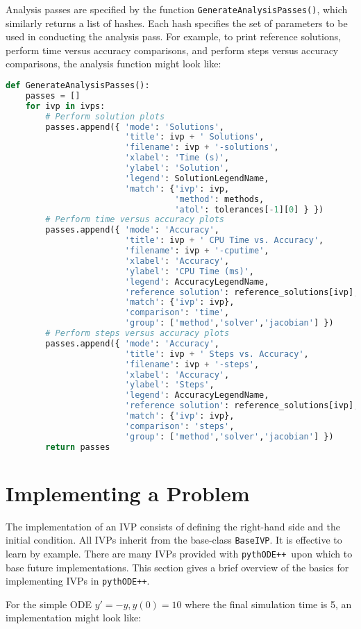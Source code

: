 \documentclass[11pt]{article}
\newcommand{\pypp}{\texttt{pythODE++}}
\begin{document}
Analysis passes are specified by the function
\verb=GenerateAnalysisPasses()=, which similarly returns a list of
hashes. Each hash specifies the set of parameters to be used in
conducting the analysis pass. For example, to print reference
solutions, perform time versus accuracy comparisons, and perform steps
versus accuracy comparisons, the analysis function might look like:
\begin{lstlisting}[tabsize=4,language=Python]
def GenerateAnalysisPasses():
	passes = []
	for ivp in ivps:
		# Perform solution plots
		passes.append({ 'mode': 'Solutions',
						'title': ivp + ' Solutions',
						'filename': ivp + '-solutions',
						'xlabel': 'Time (s)',
						'ylabel': 'Solution',
						'legend': SolutionLegendName,
						'match': {'ivp': ivp,
								  'method': methods,
								  'atol': tolerances[-1][0] } })
		# Perform time versus accuracy plots
		passes.append({ 'mode': 'Accuracy',
						'title': ivp + ' CPU Time vs. Accuracy',
						'filename': ivp + '-cputime',
						'xlabel': 'Accuracy',
						'ylabel': 'CPU Time (ms)',
						'legend': AccuracyLegendName,
						'reference solution': reference_solutions[ivp],
						'match': {'ivp': ivp},
						'comparison': 'time',
						'group': ['method','solver','jacobian'] })
		# Perform steps versus accuracy plots
		passes.append({ 'mode': 'Accuracy',
						'title': ivp + ' Steps vs. Accuracy',
						'filename': ivp + '-steps',
						'xlabel': 'Accuracy',
						'ylabel': 'Steps',
						'legend': AccuracyLegendName,
						'reference solution': reference_solutions[ivp],
						'match': {'ivp': ivp},
						'comparison': 'steps',
						'group': ['method','solver','jacobian'] })
		return passes
\end{lstlisting}


\section{Implementing a Problem}

The implementation of an IVP consists of defining the right-hand side
and the initial condition. All IVPs inherit from the base-class
\verb=BaseIVP=. It is effective to learn by example. There are many IVPs
provided with \pypp\ upon which to base future implementations. This
section gives a brief overview of the basics for implementing IVPs in
\pypp.

For the simple ODE $y'=-y, y(0)=10$ where the final simulation time is
5, an implementation might look like:
\end{document}
